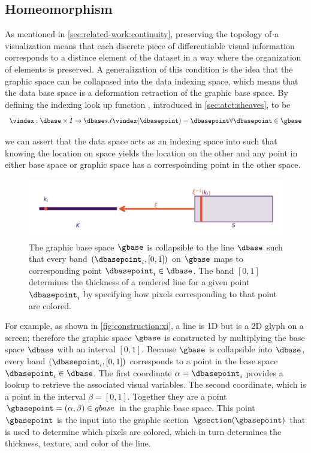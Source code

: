 \documentclass[journal]{IEEEtran}
\theoremstyle{definition}
\theoremstyle{remark}
\begin{document}
\subsection{Homeomorphism}
As mentioned in \autoref{sec:related-work:continuity}, preserving the topology of a visualization means that each discrete piece of differentiable visual information corresponds to a distince element of the dataset\cite{ziemkiewiczEmbeddingInformationVisualization2009} in a way where the organization of elements is preserved. A generalization of this condition is the idea that the graphic space can be collapased into the data indexing space, which means that the data base space is a deformation retraction of the graphic base space\cite{hatcherAlgebraicTopology2002}. By defining the indexing look up function \vindex, introduced in \autoref{sec:atct:sheaves}, to be 
\begin{equation}
  \vindex: \dbase \times I \rightarrow \dbase s.t \vindex(\dbasepoint) = \dbasepoint \forall \dbasepoint \in \gbase
\end{equation}

we can assert that the data space \dbase acts as an indexing space into \gbase such that knowing the location on space yields the location on the other and any point in either base space or graphic space has a correspoinding point in the other space. 
\begin{figure}[H]
  \includegraphics[width=1\columnwidth]{deform_retract.png}
  \caption{The graphic base space $\gbase$ is collapsible to the line $\dbase$ such that every band $(\dbasepoint_i, [0,1])$ on $\gbase$ maps to corresponding point $\dbasepoint_i \in \dbase$. The band $[0,1]$ determines the thickness of a rendered line for a given point $\dbasepoint_{i}$ by specifying how pixels corresponding to that point are colored. \label{fig:construction:xi}}
\end{figure}

For example, as shown in \autoref{fig:construction:xi}, a line is 1D but is a 2D glyph on a screen; therefore the graphic space $\gbase$ is constructed by multiplying the base space $\dbase$ with an interval $[0,1]$. Because $\gbase$ is collapsible into $\dbase$, every band $(\dbasepoint_i, [0,1])$ corresponds to a point in the base space $\dbasepoint_i \in \dbase$. The first coordinate $\alpha=\dbasepoint_i$ provides a lookup to retrieve the associated visual variables. The second coordinate, which is a point in the interval $\beta=[0,1]$. Together they are a point $\gbasepoint=(\alpha,\beta) \in gbase$ in the graphic base space. This point $\gbasepoint$ is the input into the graphic section $\gsection(\gbasepoint)$ that is used to determine which pixels are colored, which in turn determines the thickness, texture, and color of the line. 
\end{document}
